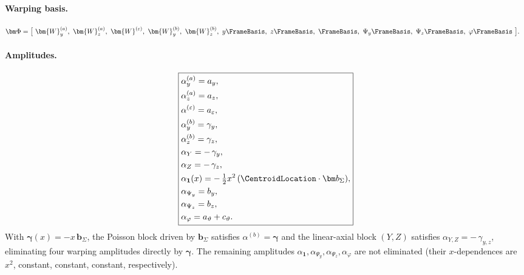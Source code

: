 \paragraph{Warping basis.}
\begin{align*}
&\bm\Phi=\big[\ \bm{W}^{(a)}_y,\ \bm{W}^{(a)}_z,\ \bm{W}^{(\varepsilon)},\
                 \bm{W}^{(b)}_y,\ \bm{W}^{(b)}_z,\
                 y\FrameBasis,\ z\FrameBasis,\ 
                 \FrameBasis,\
                 \Psi_y\FrameBasis,\ \Psi_z\FrameBasis,\ \varphi\FrameBasis\ \big].
\end{align*}

\paragraph{Amplitudes.}
\begin{equation*}
\boxed{
\begin{aligned}
&\alpha^{(a)}_y=a_y,\\
&\alpha^{(a)}_z=a_z,\\ &\alpha^{(\varepsilon)}=a_\varepsilon,\\
&\alpha^{(b)}_y=\gamma_y,\\ 
&\alpha^{(b)}_z=\gamma_z,\\
&\alpha_{Y}=-\,\gamma_y,\\ 
&\alpha_{Z}=-\,\gamma_z,\\
&\alpha_{\mathbf{1}}(x)=-\,\tfrac{1}{2} x^2\,(\CentroidLocation\cdot\bm b_\Sigma),\\
&\alpha_{\Psi_y}=b_y,\\
&\alpha_{\Psi_z}=b_z,\\
&\alpha_{\varphi}=a_\vartheta+c_\vartheta.
\end{aligned}}
\end{equation*}
With \(\bm{\gamma}(x)=-x\,\bm b_\Sigma\), the Poisson block driven by \(\bm b_\Sigma\) satisfies
\(\alpha^{(b)}=\bm{\gamma}\) and the linear-axial block \((Y,Z)\) satisfies
\(\alpha_{Y,Z}=-\,\gamma_{y,z}\), eliminating four warping amplitudes directly by \(\bm{\gamma}\).
The remaining amplitudes \(\alpha_{\mathbf{1}},\alpha_{\Psi_y},\alpha_{\Psi_z},\alpha_{\varphi}\) are not eliminated
(their \(x\)-dependences are \(x^2\), constant, constant, constant, respectively).


